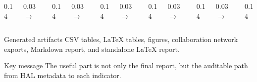 \begin{frame}[t]

  \vspace{0.2cm}

  \begin{columns}[c,onlytextwidth]
    \begin{column}{0.14\textwidth}
    \end{column}
    \begin{column}{0.03\textwidth}
      \centering $\rightarrow$
    \end{column}
    \begin{column}{0.14\textwidth}
    \end{column}
    \begin{column}{0.03\textwidth}
      \centering $\rightarrow$
    \end{column}
    \begin{column}{0.14\textwidth}
    \end{column}
    \begin{column}{0.03\textwidth}
      \centering $\rightarrow$
    \end{column}
    \begin{column}{0.14\textwidth}
    \end{column}
    \begin{column}{0.03\textwidth}
      \centering $\rightarrow$
    \end{column}
    \begin{column}{0.14\textwidth}
    \end{column}
    \begin{column}{0.03\textwidth}
      \centering $\rightarrow$
    \end{column}
    \begin{column}{0.14\textwidth}
    \end{column}
  \end{columns}

  \vspace{0.7cm}

  \begin{block}{Generated artifacts}
    CSV tables, LaTeX tables, figures, collaboration network exports, Markdown report, and standalone LaTeX report.
  \end{block}

  \begin{block}{Key message}
    The useful part is not only the final report, but the auditable path from HAL metadata to each indicator.
  \end{block}
\end{frame}

